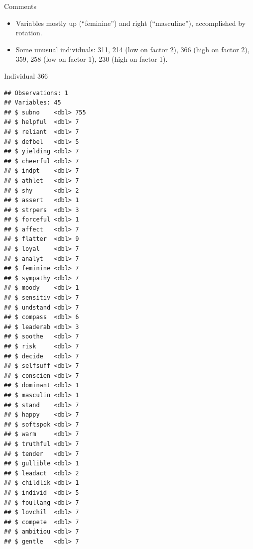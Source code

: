 \documentclass[ignorenonframetext,]{beamer}
\newenvironment{Shaded}{\begin{snugshade}}{\end{snugshade}}
\newcommand{\DecValTok}[1]{\textcolor[rgb]{0.00,0.00,0.81}{#1}}
\newcommand{\KeywordTok}[1]{\textcolor[rgb]{0.13,0.29,0.53}{\textbf{#1}}}
\newcommand{\NormalTok}[1]{#1}
\newcommand{\OperatorTok}[1]{\textcolor[rgb]{0.81,0.36,0.00}{\textbf{#1}}}
\newcommand{\StringTok}[1]{\textcolor[rgb]{0.31,0.60,0.02}{#1}}
\begin{document}
\begin{frame}{Comments}
\protect\hypertarget{comments-38}{}

\begin{itemize}
\item
  Variables mostly up (``feminine'') and right (``masculine''),
  accomplished by rotation.
\item
  Some unusual individuals: 311, 214 (low on factor 2), 366 (high on
  factor 2), 359, 258 (low on factor 1), 230 (high on factor 1).
\end{itemize}

\end{frame}

\begin{frame}[fragile]{Individual 366}
\protect\hypertarget{individual-366}{}

\tiny

\begin{Shaded}
\end{Shaded}

\begin{verbatim}
## Observations: 1
## Variables: 45
## $ subno    <dbl> 755
## $ helpful  <dbl> 7
## $ reliant  <dbl> 7
## $ defbel   <dbl> 5
## $ yielding <dbl> 7
## $ cheerful <dbl> 7
## $ indpt    <dbl> 7
## $ athlet   <dbl> 7
## $ shy      <dbl> 2
## $ assert   <dbl> 1
## $ strpers  <dbl> 3
## $ forceful <dbl> 1
## $ affect   <dbl> 7
## $ flatter  <dbl> 9
## $ loyal    <dbl> 7
## $ analyt   <dbl> 7
## $ feminine <dbl> 7
## $ sympathy <dbl> 7
## $ moody    <dbl> 1
## $ sensitiv <dbl> 7
## $ undstand <dbl> 7
## $ compass  <dbl> 6
## $ leaderab <dbl> 3
## $ soothe   <dbl> 7
## $ risk     <dbl> 7
## $ decide   <dbl> 7
## $ selfsuff <dbl> 7
## $ conscien <dbl> 7
## $ dominant <dbl> 1
## $ masculin <dbl> 1
## $ stand    <dbl> 7
## $ happy    <dbl> 7
## $ softspok <dbl> 7
## $ warm     <dbl> 7
## $ truthful <dbl> 7
## $ tender   <dbl> 7
## $ gullible <dbl> 1
## $ leadact  <dbl> 2
## $ childlik <dbl> 1
## $ individ  <dbl> 5
## $ foullang <dbl> 7
## $ lovchil  <dbl> 7
## $ compete  <dbl> 7
## $ ambitiou <dbl> 7
## $ gentle   <dbl> 7
\end{verbatim}

\normalsize

\end{frame}
\end{document}

